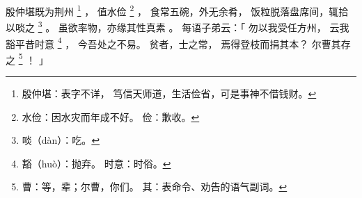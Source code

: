 
\switchcolumn*[\section{}]

殷仲堪既为荆州%
\footnote{%
    殷仲堪：表字不详，
            笃信天师道，生活俭省，可是事神不借钱财。
}%
，
值水俭%
\footnote{%
    水俭：因水灾而年成不好。
    俭：歉收。
}%
，
食常五碗，外无余肴，
饭粒脱落盘席间，辄拾以啖之%
\footnote{%
    啖（dàn）：吃。
}%
。
虽欲率物，亦缘其性真素
。
每语子弟云：「
    勿以我受任方州，
    云我豁平昔时意%
    \footnote{%
        豁（huò）：抛弃。
        时意：时俗。
    }%
    ，
    今吾处之不易。
    贫者，士之常，
    焉得登枝而捐其本？
    尔曹其存之%
    \footnote{%
        曹：等，辈；尔曹，你们。
        其：表命令、劝告的语气副词。
    }%
    ！
」

\switchcolumn


